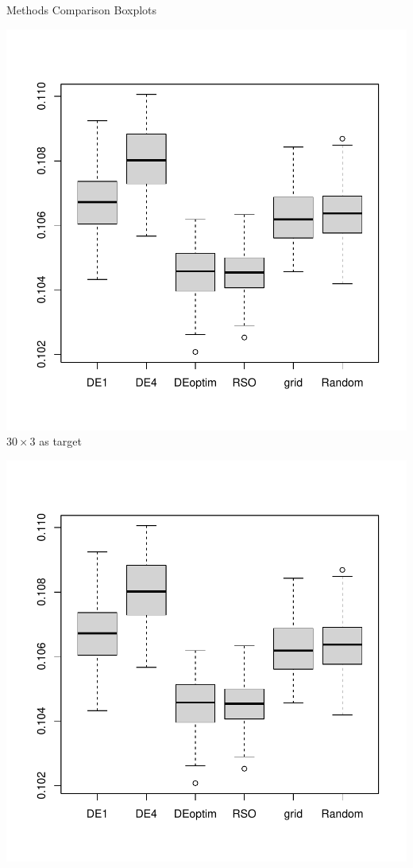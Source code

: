 \documentclass{beamer}
\begin{document}
\begin{frame}{Methods Comparison Boxplots}
\begin{minipage}{0.32\textwidth}
   \centering
   \includegraphics[]{../chapters/RSO/pdfs/boxplots2}
   \small {$30\times 3$ as target}
\end{minipage}
\begin{minipage}{0.32\textwidth}
   \centering
   \includegraphics[]{../chapters/RSO/pdfs/boxplots3}

\end{minipage}
\end{frame}
\end{document}
